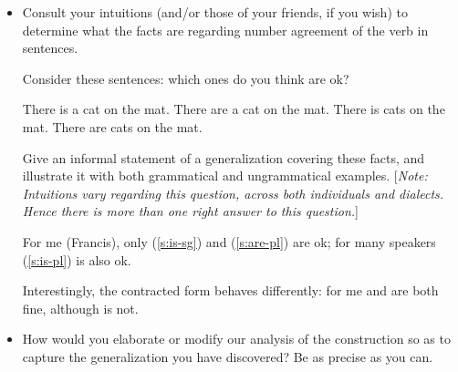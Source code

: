 \documentclass[a4paper,landscape,headrule,footrule]{foils}
\begin{document}
\begin{itemize}
\item[A.] Consult your intuitions (and/or those of your friends, if
  you wish) to determine what the facts are regarding number
 agreement of the verb in  sentences.

 Consider these sentences: which ones do you think are ok?

  \begin{exe}
    \ex\label{s:is-sg} There is a cat on the mat.
    \ex\label{s:are-sg} There are a cat on the mat.
    \ex\label{s:is-pl} There is cats on the mat.
    \ex\label{s:are-pl} There are cats on the mat.
  \end{exe}

\newpage
  Give an informal
  statement of a generalization covering these facts, and illustrate
  it with both grammatical and ungrammatical examples.  [{\sl Note:
    Intuitions vary regarding this question, across both individuals
    and dialects.  Hence there is more than one right answer to this
    question.}]

  For me (Francis), only (\ref{s:is-sg}) and (\ref{s:are-pl}) are ok;
  for many speakers (\ref{s:is-pl}) is also ok.

  Interestingly, the contracted form behaves differently: for me
   and  are
  both fine, although  is not.

  
  
\item[B.] How would you elaborate or modify our analysis of the 
  construction so as to capture the generalization you have discovered?
  Be as precise as you can.
\end{itemize}


\end{document}
